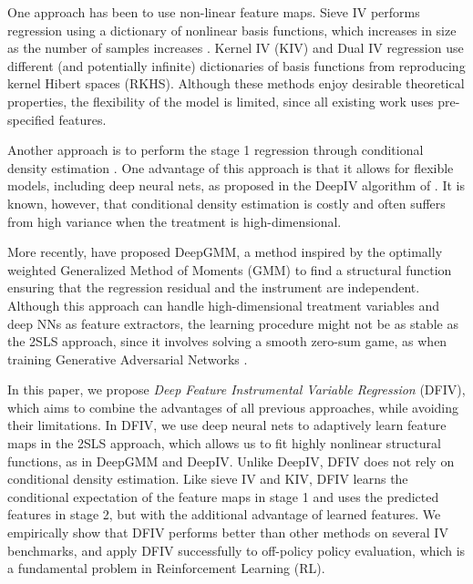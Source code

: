 One approach has been to use non-linear feature maps.  Sieve IV performs regression using a 
dictionary of nonlinear basis functions, which increases in size as the number of samples increases \citep{Newey2003,blundell2007semi-nonparametric, chen2012estimation,Chen2018}.
Kernel IV (KIV) \citep{Singh2019} and Dual IV regression \citep{Muandet2019} use different (and potentially infinite) dictionaries of basis functions from reproducing kernel Hibert spaces (RKHS). Although these methods enjoy desirable theoretical properties, the flexibility of the model is limited, since all existing work uses  pre-specified features.

Another approach %
is to perform the stage 1 regression through conditional density estimation \citep{Carrasco2007, Darolles2011,Hartford2017}. One advantage of this approach is that it allows for flexible models, including deep neural nets, as proposed in the DeepIV algorithm of \citep{Hartford2017}. It is known, however, that conditional density estimation is costly and often suffers from high variance when the treatment is high-dimensional. 

More recently, \citet{Bennett2019} have proposed DeepGMM, a method inspired by the optimally weighted Generalized Method of Moments (GMM) \citep{Hansen1982} to find a structural function ensuring that the regression residual and the instrument are independent. Although this approach can handle high-dimensional treatment variables and deep NNs as feature extractors, the learning procedure might not be as stable as the 2SLS approach, since it involves solving a smooth zero-sum game, as when training Generative Adversarial Networks \citep{wiatrak2019stabilizing}.

In this paper, we propose {\it Deep Feature Instrumental Variable Regression} (DFIV), which aims to combine the advantages of all previous approaches, while avoiding their limitations.  In DFIV, we use deep neural nets to adaptively learn feature maps in the 2SLS approach, which allows us to fit highly nonlinear structural functions, as in DeepGMM and DeepIV. Unlike DeepIV, DFIV does not rely on conditional density estimation. Like sieve IV and KIV, DFIV learns the conditional expectation of the feature maps in stage 1 and uses the predicted features in stage 2, but with the additional advantage of learned features. We empirically show that DFIV performs better than other methods on several IV benchmarks, and apply DFIV successfully to off-policy policy evaluation, which is a fundamental problem in Reinforcement Learning (RL).

